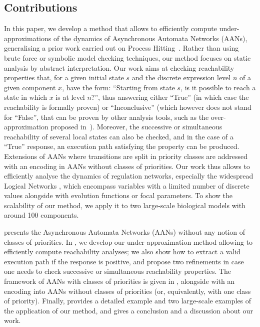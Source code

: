 \subsection*{Contributions}
In this paper, we develop a method
that allows to efficiently compute under-approximations of the dynamics
of Asynchronous Automata Networks (AANs),
generalising a prior work carried out on Process Hitting~\cite{PMR12-MSCS}.
Rather than using brute force or symbolic model checking techniques,
our method focuses on static analysis by abstract interpretation.
Our work aims at checking reachability properties that,
for a given initial state $s$ and the discrete expression level $n$
of a given component $x$,
have the form:
“Starting from state $s$, is it possible to reach
a state in which $x$ is at level $n$?”,
thus answering either “True”
(in which case the reachability is formally proven)
or “Inconclusive”
(which however does not stand for “False”, that can be proven by other analysis tools,
such as the over-approximation proposed in~\cite{PMR12-MSCS}).
Moreover, the successive or simultaneous reachability of several local states
can also be checked,
and in the case of a “True” response,
an execution path satisfying the property can be produced.
Extensions of AANs where transitions are split in priority classes are addressed with an encoding in
AANs without classes of priorities.
Our work thus allows to efficiently analyse the dynamics
of regulation networks,
especially the widespread Logical Networks \cite{Thomas95,deJong02},
which encompass variables with a limited number of discrete values
alongside with evolution functions or focal parameters.
To show the scalability of our method, we apply it to two
large-scale biological models with around 100 components.

 presents the Asynchronous Automata Networks (AANs)
without any notion of classes of priorities.
In ,
we develop our under-approximation method allowing to efficiently
compute reachability analyses;
we also show how to extract a valid execution path if the response is positive,
and propose two refinements in case one needs to check
successive or simultaneous reachability properties.
The framework of AANs with classes of priorities is given in ,
alongside with an encoding into AANs without classes of priorities
(or, equivalently, with one class of priority).
Finally,  provides a detailed example and two large-scale examples
of the application of our method,
and  gives a conclusion and a discussion about our work.

